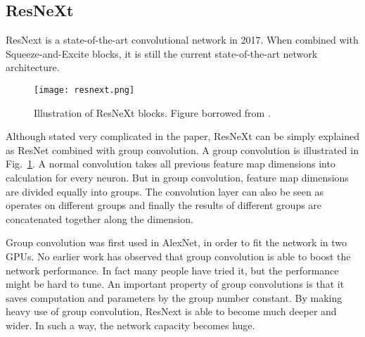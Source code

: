 \subsection{ResNeXt}

ResNext is a state-of-the-art convolutional network in 2017\cite{xie2017aggregated}. When combined with Squeeze-and-Excite blocks, it is still the current state-of-the-art network architecture.
\begin{figure}[!htp]
	\centering
	\texttt{[image: resnext.png]}
	\caption[Illustration of ResNeXt blocks]
	{Illustration of ResNeXt blocks. Figure borrowed from \parencite{xie2017aggregated}.}
	\label{fig:resnext}
\end{figure}
Although stated very complicated in the paper, ResNeXt can be simply explained as ResNet combined with group convolution. A group convolution is illustrated in Fig.~\ref{fig:resnext}.  A normal convolution takes all previous feature map dimensions into calculation for every neuron. But in group convolution, feature map dimensions are divided equally into groups. The convolution layer can also be seen as operates on different groups and finally the results of different groups are concatenated together along the dimension.

Group convolution was first used in AlexNet, in order to fit the network in two GPUs. No earlier work has observed that group convolution is able to boost the network performance. In fact many people have tried it, but the performance might be hard to tune. An important property of group convolutions is that it saves computation and parameters by the group number constant. By making heavy use of group convolution, ResNext is able to become much deeper and wider. In such a way, the network capacity becomes huge.

